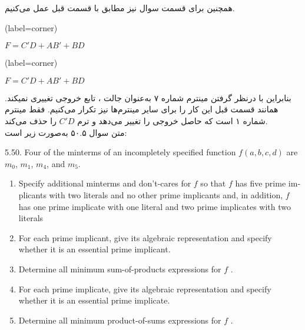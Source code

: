 همچنین برای قسمت  سوال نیز مطابق با قسمت قبل عمل می‌کنیم. 

\begin{latin}
	\begin{minipage}{0.48\textwidth}
		\centering
		\begin{karnaugh-map}[4][4][1][$B$][$A$][$D$][$C$](label=corner)
		\end{karnaugh-map}

		$F=C'D+AB'+BD$
	\end{minipage}
	\hfill
	\begin{minipage}{0.48\textwidth}
		\centering
		\begin{karnaugh-map}[4][4][1][$B$][$A$][$D$][$C$](label=corner)
		\end{karnaugh-map}

		$F=C'D+AB'+BD$
	\end{minipage}	
\end{latin}
 
 بنابراین با درنظر گرفتن مینترم شماره ۷ به‌عنوان جالت ، تابع خروجی تغییری نمیکند. همانند قسمت قبل این کار را برای سایر مینترم‌ها نیز تکرار می‌کنیم. فقط مینترم شماره ۱ است که حاصل خروجی را تغییر می‌دهد و ترم $C'D$ را حذف می‌کند. \\





متن سوال ۵۰.۵ به‌صورت زیر است:

\begin{latin}
	5.50. Four of the minterms of an incompletely specified function $f(a, b, c, d)$ are $m_0$, $m_1$, $m_4$, and $m_5$.
	
	\begin{enumerate}
		\item 
		Specify additional minterms and don’t-cares for $f$ so that $f$ has five prime implicants with two literals and no other prime implicants and, in addition, $f$ has one prime implicate with one literal and two prime implicates with two literals
		
		\item 
		For each prime implicant, give its algebraic representation and specify whether
		it is an essential prime implicant.
		
		\item 
		Determine all minimum sum-of-products expressions for $f$ .
		
		\item 
		For each prime implicate, give its algebraic representation and specify whether
		it is an essential prime implicate.
		
		\item 
		Determine all minimum product-of-sums expressions for $f$ .
	\end{enumerate}
\end{latin}




